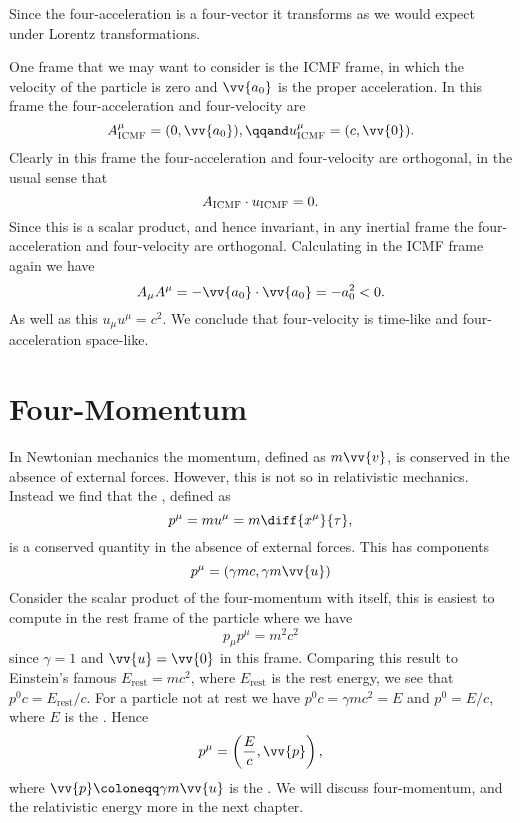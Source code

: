 \documentclass[fleqn]{NotesClass}
\newcommand{\ICMF}{\textsc{ICMF}}
\begin{document}
    Since the four-acceleration is a four-vector it transforms as we would expect under Lorentz transformations.
    
    One frame that we may want to consider is the \ICMF{} frame, in which the velocity of the particle is zero and \(\vv{a_0}\) is the proper acceleration.
    In this frame the four-acceleration and four-velocity are
    \begin{equation}
        A^\mu_{\ICMF} = (0, \vv{a_0}), \qqand u^\mu_{\ICMF} = (c, \vv{0}).
    \end{equation}
    Clearly in this frame the four-acceleration and four-velocity are orthogonal, in the usual sense that
    \begin{equation}
        A_{\ICMF} \cdot u_{\ICMF} = 0.
    \end{equation}
    Since this is a scalar product, and hence invariant, in any inertial frame the four-acceleration and four-velocity are orthogonal.
    Calculating in the \ICMF{} frame again we have
    \begin{equation}
        A_\mu A^\mu = -\vv{a_0}\cdot\vv{a_0} = -a_0^2 < 0.
    \end{equation}
    As well as this \(u_\mu u^\mu = c^2\).
    We conclude that four-velocity is time-like and four-acceleration space-like.
    
    \section{Four-Momentum}
    In Newtonian mechanics the momentum, defined as \(m\vv{v}\), is conserved in the absence of external forces.
    However, this is not so in relativistic mechanics.
    Instead we find that the , defined as
    \begin{equation}
        p^\mu = mu^\mu = m\diff{x^\mu}{\tau},
    \end{equation}
    is a conserved quantity in the absence of external forces.
    This has components
    \begin{equation}
        p^\mu = (\gamma mc, \gamma m\vv{u})
    \end{equation}
    Consider the scalar product of the four-momentum with itself, this is easiest to compute in the rest frame of the particle where we have
    \begin{equation}
        p_\mu p^\mu = m^2c^2
    \end{equation}
    since \(\gamma = 1\) and \(\vv{u} = \vv{0}\) in this frame.
    Comparing this result to Einstein's famous \(E_{\mathrm{rest}} = mc^2\), where \(E_{\mathrm{rest}}\) is the rest energy, we see that \(p^0c = E_{\mathrm{rest}}/c\).
    For a particle not at rest we have \(p^0c = \gamma mc^2 = E\)  and \(p^0 = E/c\), where \(E\) is the .
    Hence
    \begin{equation}
        p^\mu = \left( \frac{E}{c}, \vv{p} \right),
    \end{equation}
    where \(\vv{p} \coloneqq \gamma m\vv{u}\) is the .
    We will discuss four-momentum, and the relativistic energy more in the next chapter.
    
\end{document}
